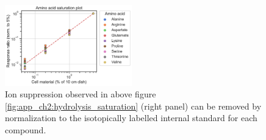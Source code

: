 \begin{figure}[ht]
    \centering
    \includegraphics[width=0.49\textwidth]{figures/chap2/app/hydrolysis_AA_saturation_RR.pdf}
    \caption[Hydrolyzed amino acids normalized with internal standards.]{
    Ion suppression observed in above figure \ref{fig:app_ch2:hydrolysis_saturation} (right panel) can be removed by normalization to the isotopically labelled internal standard for each compound.
    }
    \label{fig:app_ch2:hydrolysis_AA_saturation_RR}
\end{figure}


